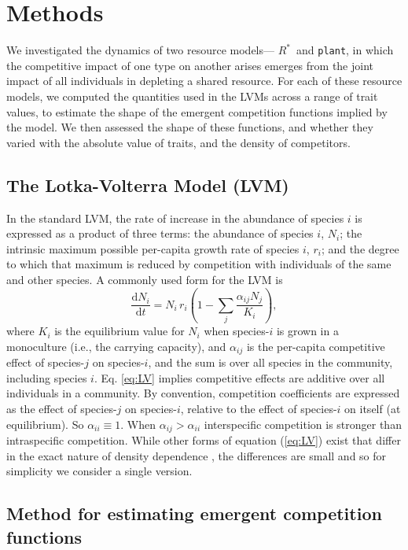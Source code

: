 \documentclass[a4paper,11pt]{article}
\newcommand{\ud}{\ensuremath{\mathrm{d}}}
\newcommand{\Rstar}{\ensuremath{R^*}}
\newcommand{\plant}{{\tt plant}}
\begin{document}
\section{Methods}

We investigated the dynamics of two resource models--- \Rstar\  and \plant, in which the competitive impact of one type on another arises emerges from the joint impact of all individuals in depleting a shared resource. For each of these resource models, we computed the quantities used in the LVMs across a range of trait values, to estimate the shape of the emergent competition functions implied by the model. We then assessed the shape of these functions, and whether they varied with the absolute value of traits, and the density of competitors.

\subsection{The Lotka-Volterra Model (LVM)}

In the standard LVM, the rate of increase in the abundance of species $i$ is expressed as a product of three terms: the abundance of species $i$, $N_i$; the intrinsic maximum possible per-capita growth rate of species $i$, $r_i$; and the degree to which that maximum is reduced by competition with individuals of the same and other species. A commonly used form for the LVM is 
\begin{equation} \label{eq:LV} 
	\frac{\ud N_i}{\ud t} = N_i\, r_i \left(1 - \sum_j \frac{\alpha_{ij} N_j}{K_i}\right), 
\end{equation}
where $K_i$ is the equilibrium value for $N_i$ when species-$i$ is grown in a monoculture (i.e., the carrying capacity), and $\alpha_{ij}$ is the per-capita competitive effect of species-$j$ on species-$i$, and the sum is over all species in the community, including species $i$. Eq. \ref{eq:LV} implies competitive effects are additive over all individuals in a community. By convention, competition coefficients are expressed as the effect of species-$j$ on species-$i$, relative to the effect of species-$i$ on itself (at equilibrium).  So $\alpha_{ii} \equiv 1$. When $\alpha_{ij} > \alpha_{ii}$ interspecific competition is stronger than intraspecific competition. While other forms of equation (\ref{eq:LV}) exist that differ in the exact nature of density dependence \citep[e.g.][]{Leimar-2013}, the differences are small and so for simplicity we consider a single version.


\subsection{Method for estimating emergent competition functions}
\end{document}
